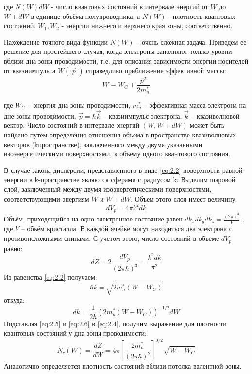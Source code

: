 где $N(W)dW$ - число  квантовых состояний в интервале энергий от $W$ до $W+dW$ в единице объёма полупроводника, а $N(W)$
-  плотность квантовых состояний. $W_1,W_2$ - энергии нижнего и верхнего края зоны, соответственно. 

Нахождение точного вида функции $N(W)$ – очень сложная задача. Приведем ее решение для простейшего случая, когда электроны
заполняют только уровни вблизи дна зоны проводимости, т.е. для описания зависимости энергии носителей от квазиимпульса
$W(~\vec{p}~)$ справедливо приближение эффективной массы:   
\begin{equation}
	W = W_C + \frac{p^2}{2m_n^*}
	\label{eq:2.2}
\end{equation}

где $W_C$ – энергия дна зоны проводимости, $m_n^*$ –  эффективная масса электрона на дне зоны проводимости, $\vec{p} =
\hbar \vec{k}$ – квазиимпульс электрона, $\vec{k}$ – квазиволновой вектор. Число состояний в интервале энергий $(W, W+dW)$ может быть найдено
путем определения отношения объема в пространстве квазиволновых векторов (kпространстве), заключенного между двумя
указанными изоэнергетическими поверхностями, к объему одного квантового состояния. 

В случае закона дисперсии, представленного в виде \eqref{eq:2.2} поверхности равной энергии в k-пространстве являются
сферами с радиусом k. Выделим шаровой слой, заключенный между двумя изоэнергетическими поверхностями, соответствующими
энергиям $W$ и $W+dW$. Объем этого слоя имеет величину: 
\begin{equation}
	dV_p = 4 \pi k^2 d k
	\label{eq:2.3}
\end{equation}
Объём, приходящийся на одно электронное состояние равен $dk_x dk_y dk_z = \frac{(2 \pi)^3}{V}$ , где $V$ – объём
кристалла. В каждой ячейке могут находиться два электрона с противоположными спинами. С учетом этого, число состояний в
объеме $dV_p$ равно: 
\begin{equation}
	d Z=2 \frac{d V_{p}}{(2 \pi \hbar)^{3}}=\frac{k^{2} d k}{\pi^{2}}
	\label{eq:2.4}
\end{equation}
Из равенства \eqref{eq:2.2} получаем: 
\begin{equation}
	\hbar k=\sqrt{2 m_{n}^{*}\left(W-W_{C}\right)}
	\label{eq:2.5}
\end{equation}
откуда:
\begin{equation}
	d k=\frac{1}{2 \hbar}\left(2 m_{n}^{*}\left(W-W_{C}\right)\right)^{-1 / 2} d W
	\label{eq:2.6}
\end{equation}
Подставляя \eqref{eq:2.5} и \eqref{eq:2.6} в \eqref{eq:2.4}, получим выражение для плотности квантовых состояний у дна зоны
проводимости:
\begin{equation}
	N_{c}(W)=\frac{d Z}{d W}=4 \pi\left[\frac{2 m_{n}^{*}}{(2 \pi \hbar)^{2}}\right]^{3 / 2} \sqrt{W-W_{C}}
	\label{eq:2.7}
\end{equation} 
Аналогично определяется плотность состояний вблизи потолка валентной зоны.

